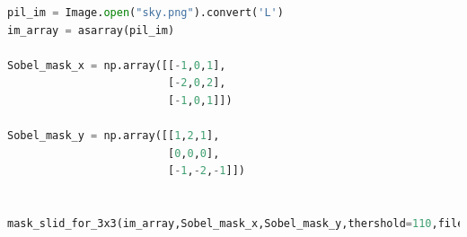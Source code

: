 \documentclass{my_paper}
\begin{document}
\begin{lstlisting}[language=python]
pil_im = Image.open("sky.png").convert('L')
im_array = asarray(pil_im)

Sobel_mask_x = np.array([[-1,0,1],
                         [-2,0,2],
                         [-1,0,1]])

Sobel_mask_y = np.array([[1,2,1],
                         [0,0,0],
                         [-1,-2,-1]])


mask_slid_for_3x3(im_array,Sobel_mask_x,Sobel_mask_y,thershold=110,file_name='sky_sobel_110_')



\end{lstlisting}
\end{document}

